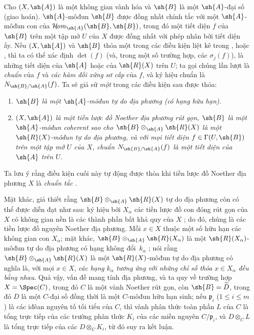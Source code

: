 \documentclass[oneside,10pt]{amsart}
\renewcommand{\leq}{\leqslant}
\def\shHom{\mathcal{H}\!\mathit{om}}
\newcommand{\oldpage}[2][]{\marginnote{\normalfont\footnotesize\textbf{#1}~|~#2}\ignorespaces}
\let\EGAOriginalLabel\label
\renewcommand{\label}[1]{\phantomsection\EGAOriginalLabel{#1}}
\begin{document}
\begin{env}[6.5.1]
\label{II.6.5.1}
Cho $(X,\sh{A})$ là một không gian vành hóa và $\sh{B}$ là một $\sh{A}$-đại số (giao hoán).
$\sh{A}$-môđun $\sh{B}$ được đồng nhất chính tắc với một $\sh{A}$-môđun con của $\shHom_{\sh{A}}(\sh{B},\sh{B})$, trong đó một tiết diện $f$ của $\sh{B}$ trên một tập mở $U$ của $X$ được đồng nhất với phép nhân bởi tiết diện ấy.
Nếu $(X,\sh{A})$ và $\sh{B}$ thỏa một trong các điều kiện liệt kê trong ,  hoặc , thì ta có thể xác định $\det(f)$ (và, trong một số trường hợp, các $\sigma_j(f)$), là những tiết diện của $\sh{A}$ hoặc của $\sh{R}(X)$ trên $U$; ta gọi chúng lần lượt là \emph{chuẩn} của $f$ và \emph{các hàm đối xứng sơ cấp} của $f$, và ký hiệu chuẩn là $N_{\sh{B}/\sh{A}}(f)$.
Ta sẽ giả sử \emph{một} trong các điều kiện sau được thỏa:
\begin{enumerate}
  \item[{\rm(I)}] \emph{$\sh{B}$ là một $\sh{A}$-môđun tự do địa phương (có hạng hữu hạn).}
  \item[{\rm(II)}] \emph{$(X,\sh{A})$ là một tiền lược đồ Noether địa phương rút gọn, $\sh{B}$ là một $\sh{A}$-môđun coherent sao cho $\sh{B}\otimes_{\sh{A}}\sh{R}(X)$ là một $\sh{R}(X)$-môđun tự do địa phương, và với mọi tiết diện $f\in\Gamma(U,\sh{B})$ trên một tập mở $U$ của $X$, chuẩn $N_{\sh{B}/\sh{A}}(f)$ là một tiết diện của $\sh{A}$ trên $U$.}
\end{enumerate}
\oldpage[II]{126}
Ta lưu ý rằng điều kiện cuối này tự động được thỏa khi tiền lược đồ Noether địa phương $X$ là \emph{chuẩn tắc} .

Mặt khác, giả thiết rằng $\sh{B}\otimes_{\sh{A}}\sh{R}(X)$ tự do địa phương còn có thể được diễn đạt như sau: ký hiệu bởi $X_\alpha$ các tiền lược đồ con đóng rút gọn của $X$ có không gian nền là các thành phần bất khả quy của $X$ ; do đó, chúng là các tiền lược đồ nguyên Noether địa phương.
Mỗi $x\in X$ thuộc một số hữu hạn các không gian con $X_\alpha$;
mặt khác, $\sh{B}\otimes_{\sh{A}}\sh{R}(X_\alpha)$ là một $\sh{R}(X_\alpha)$-môđun tự do địa phương có hạng không đổi~$k_\alpha$ ;
nói rằng $\sh{B}\otimes_{\sh{A}}\sh{R}(X)$ là một $\sh{R}(X)$-môđun tự do địa phương có nghĩa là, với mọi $x\in X$, \emph{các hạng $k_\alpha$ tương ứng với những chỉ số thỏa $x\in X_\alpha$ đều bằng nhau}.
Quả vậy, vấn đề mang tính địa phương, và ta quy về trường hợp $X=\Spec(C)$, trong đó $C$ là một vành Noether rút gọn, còn $\sh{B}=\widetilde{D}$, trong đó $D$ là một $C$-đại số đồng thời là một $C$-môđun hữu hạn sinh;
nếu $\mathfrak{p}_i$ ($1\leq i\leq m$) là các iđêan nguyên tố tối tiểu của $C$, thì vành phân thức toàn phần $L$ của $C$ là tổng trực tiếp của các trường phân thức $K_i$ của các miền nguyên $C/\mathfrak{p}_i$, và $D\otimes_C L$ là tổng trực tiếp của các $D\otimes_C K_i$, từ đó suy ra kết luận.


\end{env}
\end{document}
